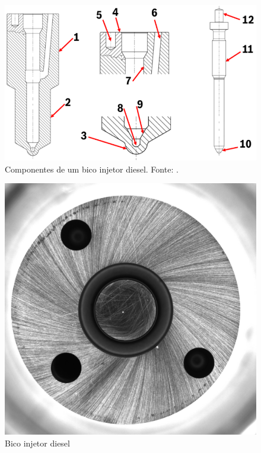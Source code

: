 \documentclass[conference]{IEEEtran}
\begin{document}
\begin{figure}[t]
	\centering
	\includegraphics[scale=0.35]{Images/bico-injetor.png}
	\caption{Componentes de um bico injetor diesel. Fonte: \cite{Girotto2023}.}
	\label{fig:bico-injetor}
\end{figure}

\begin{figure}[t]
	\centering
	\includegraphics[scale=0.10]{Images/superficie-de-vedacao.jpg}
	\caption{Bico injetor diesel}
	\label{fig:superficie-de-vedacao}
\end{figure}
\end{document}

